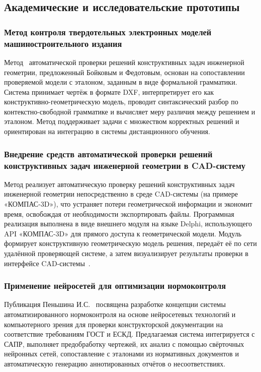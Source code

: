 \subsection{Академические и исследовательские прототипы}

\subsubsection{Метод контроля твердотельных электронных моделей машиностроительного издания}

Метод~\cite{blinova2012} автоматической проверки решений конструктивных задач инженерной геометрии,
предложенный Бойковым и Федотовым, основан на сопоставлении проверяемой модели с эталоном,
заданным в виде формальной грамматики.
Система принимает чертёж в формате DXF, интерпретирует его как конструктивно-геометрическую
модель, проводит синтаксический разбор по контекстно-свободной грамматике и вычисляет меру различия между решением и эталоном.
Метод поддерживает задачи с множеством корректных решений и ориентирован на интеграцию в системы дистанционного обучения.

\subsubsection{Внедрение средств автоматической проверки решений конструктивных задач инженерной геометрии в CAD-систему}

Метод реализует автоматическую проверку решений конструктивных задач инженерной геометрии непосредственно в среде CAD-системы (на примере «КОМПАС-3D»),
что устраняет потери геометрической информации и экономит время, освобождая от необходимости экспортировать файлы.
Программная реализация выполнена в виде внешнего модуля на языке Delphi, использующего API «КОМПАС-3D» для прямого доступа к геометрической модели.
Модуль формирует конструктивную геометрическую модель решения, передаёт её по сети удалённой проверяющей системе, а затем визуализирует результаты проверки в интерфейсе CAD-системы~\cite{integrations-cad}.

\subsubsection{Применение нейросетей для оптимизации нормоконтроля}

Публикация Пеньшина И.С.~\cite{ai-method} посвящена разработке концепции системы автоматизированного нормоконтроля
на основе нейросетевых технологий и компьютерного зрения для проверки конструкторской документации
на соответствие требованиям ГОСТ и ЕСКД.
Предлагаемая система интегрируется с САПР,
выполняет предобработку чертежей, их анализ с помощью свёрточных нейронных сетей,
сопоставление с эталонами из нормативных документов и автоматическую генерацию аннотированных отчётов о несоответствиях.

